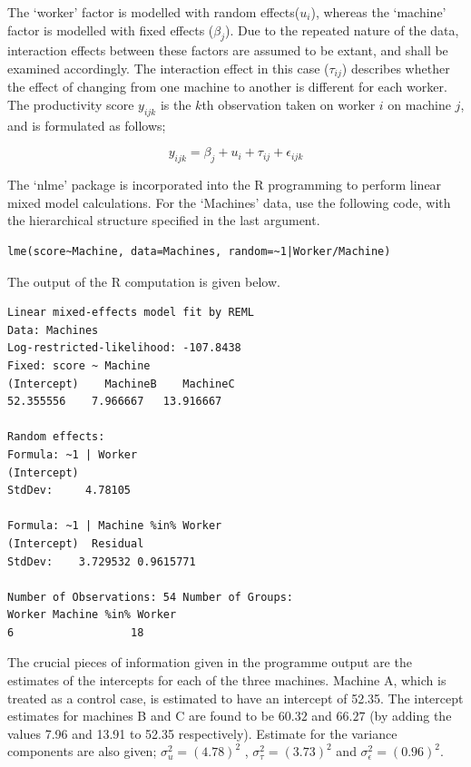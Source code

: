 \documentclass[12pt, a4paper]{report}
\theoremstyle{plain}
\theoremstyle{definition}
\theoremstyle{remark}
\begin{document}
The `worker' factor is modelled with random effects($u_{i}$),
whereas the `machine' factor is modelled with fixed effects
($\beta_{j}$). Due to the repeated nature of the data, interaction
effects between these factors are assumed to be extant, and shall
be examined accordingly. The interaction effect in this case
($\tau_{ij}$) describes whether the effect of changing from one
machine to another is different for each worker. The productivity
score $y_{ijk}$ is the $k$th observation taken on worker $i$ on
machine $j$, and is formulated
as follows;

\begin{equation}
y_{ijk} = \beta_{j} + u_{i} + \tau_{ij} + \epsilon_{ijk}
\end{equation}

The `nlme' package is incorporated into the R programming to
perform linear mixed model calculations. For the `Machines' data,
\citet{pb} use the following code, with the hierarchical structure
specified in the last argument.
\begin{verbatim}
lme(score~Machine, data=Machines, random=~1|Worker/Machine)
\end{verbatim}


The output of the R computation is given below.
\begin{verbatim}
Linear mixed-effects model fit by REML
Data: Machines
Log-restricted-likelihood: -107.8438
Fixed: score ~ Machine
(Intercept)    MachineB    MachineC
52.355556    7.966667   13.916667

Random effects:
Formula: ~1 | Worker
(Intercept)
StdDev:     4.78105

Formula: ~1 | Machine %in% Worker
(Intercept)  Residual
StdDev:    3.729532 0.9615771

Number of Observations: 54 Number of Groups:
Worker Machine %in% Worker
6                  18

\end{verbatim}


The crucial pieces of information given in the programme output
are the estimates of the intercepts for each of the three
machines. Machine A, which is treated as a control case, is
estimated to have an intercept of 52.35. The intercept estimates
for machines B and C are found to be $60.32$ and $66.27$ (by
adding the values 7.96 and 13.91 to 52.35 respectively). Estimate
for the variance components are also given; $\sigma^{2}_{u} =
(4.78)^{2}$ , $\sigma^{2}_{\tau} = (3.73)^{2}$ and
$\sigma^{2}_{\epsilon} = (0.96)^{2}$.
\end{document}
